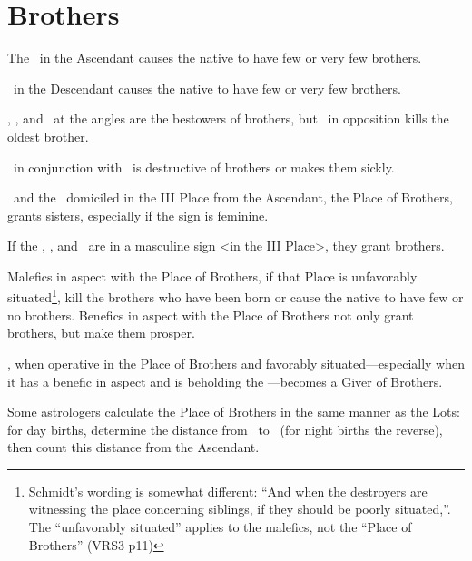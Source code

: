 \section{Brothers}
The \Sun\, in the Ascendant causes the native to have few or very few brothers. 

\Saturn\, in the Descendant causes the native to have few or very few brothers. 

\Jupiter, \Mercury, and \Venus\, at the angles are the bestowers of brothers, but \Saturn\, in opposition kills the oldest brother. 

\Saturn\, in conjunction with \Mars\, is destructive of brothers or makes them sickly. 

\Venus\, and the \Moon\, domiciled in the III Place from the Ascendant, the Place of Brothers, grants sisters, especially if the sign is feminine. 

If the \Sun, \Jupiter, and \Mercury\, are in a masculine sign <in the III Place>, they grant brothers. 

Malefics in aspect with the Place of Brothers, if that Place is unfavorably situated\footnote{Schmidt's wording is somewhat different: ``And when the destroyers are witnessing the place concerning siblings, if they should be poorly situated,''. The ``unfavorably situated'' applies to the malefics, not the ``Place of Brothers'' (VRS3 p11)}, kill the brothers who have been born or cause the native to have few or no brothers. Benefics in aspect with the Place of Brothers not only grant brothers, but make them prosper. 

\Mars, when operative in the Place of Brothers and favorably situated—especially when it has a benefic in aspect and is beholding the \Moon—becomes a Giver of Brothers.

Some astrologers calculate the Place of Brothers in the same manner as the Lots: for day births, determine the distance from \Saturn\, to \Jupiter\, (for night births the reverse), then count this distance from the Ascendant.

\newpage